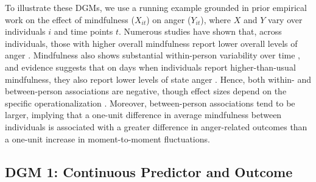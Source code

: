 \documentclass[stu]{apa7}
\begin{document}
\newpage


To illustrate these DGMs, we use a running example grounded in prior empirical work on the effect of mindfulness (\(X_{it}\)) on anger (\(Y_{it}\)), where $X$ and $Y$ vary over individuals $i$ and time points $t$. Numerous studies have shown that, across individuals, those with higher overall mindfulness report lower overall levels of anger \parencite[]{brown_benefits_2003, borders_could_2010, kashdan_what_2016, baer_relationships_2011, eisenlohr-moul_both_2016}. Mindfulness also shows substantial within-person variability over time \parencite[]{brown_benefits_2003, kiken_state_2015}, and evidence suggests that on days when individuals report higher-than-usual mindfulness, they also report lower levels of state anger \parencite[]{eisenlohr-moul_both_2016}. Hence, both within- and between-person associations are negative, though effect sizes depend on the specific operationalization \parencite{eisenlohr-moul_both_2016}. Moreover, between-person associations tend to be larger, implying that a one-unit difference in average mindfulness between individuals is associated with a greater difference in anger-related outcomes than a one-unit increase in moment-to-moment fluctuations.


\subsection{DGM 1: Continuous Predictor and Outcome}
\end{document}
